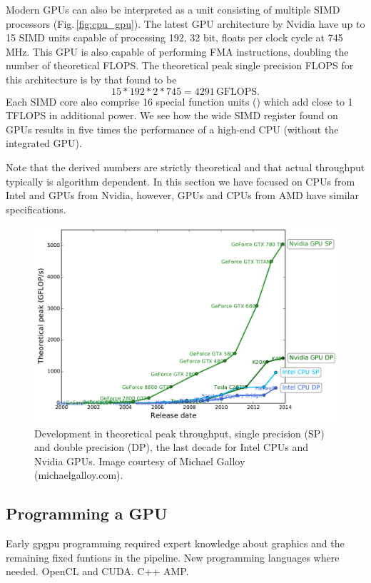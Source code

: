Modern GPUs can also be interpreted as a unit consisting of multiple SIMD processors (Fig.\,\ref{fig:cpu_gpu}). The latest GPU architecture by Nvidia have up to 15 SIMD units capable of processing 192, 32 bit, floats per clock cycle at 745 MHz. This GPU is also capable of performing FMA instructions, doubling the number of theoretical FLOPS. The theoretical peak single precision FLOPS for this architecture is by that found to be 
\begin{equation}
15*192*2*745 = 4291\,\text{GFLOPS}.
\end{equation} 
Each SIMD core also comprise 16 special function units () which add close to 1 TFLOPS in additional power. We see how the wide SIMD register found on GPUs results in five times the performance of a high-end CPU (without the integrated GPU). 

Note that the derived numbers are strictly theoretical and that actual throughput typically is algorithm dependent. In this section we have focused on CPUs from Intel and GPUs from Nvidia, however, GPUs and CPUs from AMD have similar specifications.

\begin{figure}
\centering
\includegraphics[width=\textwidth]{img/cpu_vs_gpu.pdf}
\caption{Development in theoretical peak throughput, single precision (SP) and double precision (DP), the last decade for Intel CPUs and Nvidia GPUs. Image courtesy of Michael Galloy (michaelgalloy.com).}
\label{fig:cpu_vs_gpu}
\end{figure}

\subsection{Programming a GPU}
Early gpgpu programming required expert knowledge about graphics and the remaining fixed funtions in the pipeline. New programming languages where needed. OpenCL and CUDA. C++ AMP.

